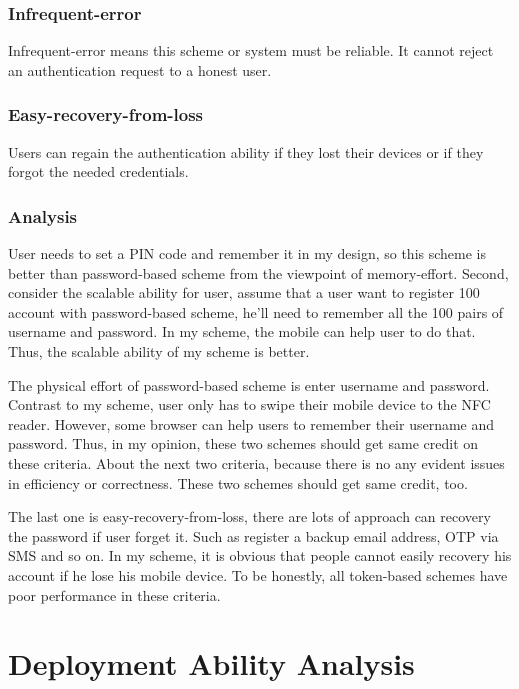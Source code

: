 \begin{CJK}{Bg5}{bsmi}
\subsubsection{Infrequent-error}

Infrequent-error means this scheme or system must be reliable. It cannot reject an authentication request to a honest user.

\subsubsection{Easy-recovery-from-loss}

Users can regain the authentication ability if they lost their devices or if they forgot the needed credentials.

\subsubsection{Analysis}

User needs to set a PIN code and remember it in my design, so this scheme is better than password-based scheme from the viewpoint of memory-effort. Second, consider the scalable ability for user, assume that a user want to register 100 account with password-based scheme, he'll need to remember all the 100 pairs of username and password. In my scheme, the mobile can help user to do that. Thus, the scalable ability of my scheme is better.

The physical effort of password-based scheme is enter username and password. Contrast to my scheme, user only has to swipe their mobile device to the NFC reader. However, some browser can help users to remember their username and password. Thus, in my opinion, these two schemes should get same credit on these criteria. About the next two criteria, because there is no any evident issues in efficiency or correctness. These two schemes should get same credit, too.

The last one is easy-recovery-from-loss, there are lots of approach can recovery the password if user forget it. Such as register a backup email address, OTP via SMS and so on. In my scheme, it is obvious that people cannot easily recovery his account if he lose his mobile device. To be honestly, all token-based schemes have poor performance in these criteria.

\section{Deployment Ability Analysis}


\end{CJK}
